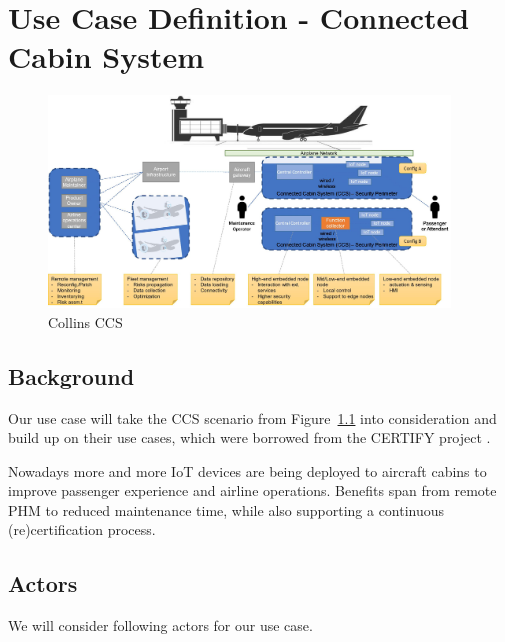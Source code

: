 \chapter{Use Case Definition - Connected Cabin System}
\label{chap:Use Case Definition - Connected Cabin System}

\begin{figure}
	\begin{center}
		\includegraphics[width=0.95\textwidth]{figures/collins-ccs.jpg}
	\end{center}
	\caption{Collins CCS}
	\label{fig:Collins CCS}
\end{figure}

\section{Background} %
\label{sec:Background}

Our use case will take the CCS scenario from Figure~\ref{fig:Collins CCS} into consideration and build up on their use
cases, which were borrowed from the CERTIFY project \cite{certifyproject2023}.

Nowadays more and more IoT devices are being deployed to aircraft cabins to improve passenger experience and airline
operations. Benefits span from remote PHM to reduced maintenance time, while also supporting a
continuous (re)certification process. %


\section{Actors} %
\label{sec:Actors}

We will consider following actors for our use case.

